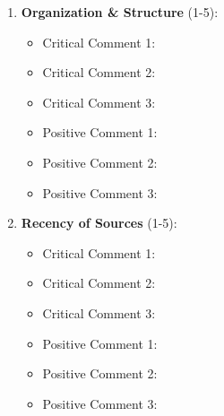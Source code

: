 \documentclass[12pt]{article}
\begin{document}
\begin{enumerate}
    \item \textbf{Organization \& Structure} (1-5): \underline{\hspace{2cm}}
    \begin{itemize}
        \item Critical Comment 1: \underline{\hspace{12cm}}
        \item Critical Comment 2: \underline{\hspace{12cm}}
        \item Critical Comment 3: \underline{\hspace{12cm}}
        \item Positive Comment 1: \underline{\hspace{12cm}}
        \item Positive Comment 2: \underline{\hspace{12cm}}
        \item Positive Comment 3: \underline{\hspace{12cm}}
    \end{itemize}

    \vspace{0.5cm}

    \item \textbf{Recency of Sources} (1-5): \underline{\hspace{2cm}}
    \begin{itemize}
        \item Critical Comment 1: \underline{\hspace{12cm}}
        \item Critical Comment 2: \underline{\hspace{12cm}}
        \item Critical Comment 3: \underline{\hspace{12cm}}
        \item Positive Comment 1: \underline{\hspace{12cm}}
        \item Positive Comment 2: \underline{\hspace{12cm}}
        \item Positive Comment 3: \underline{\hspace{12cm}}
    \end{itemize}

    \vspace{0.5cm}


\end{enumerate}
\end{document}
